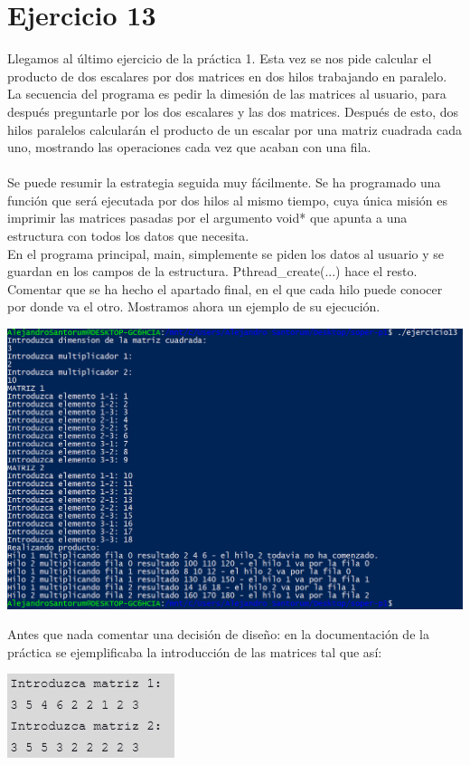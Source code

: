 \documentclass[12pt]{article}
\begin{document}
\section{Ejercicio 13}
Llegamos al último ejercicio de la práctica 1. Esta vez se nos pide calcular el producto de dos escalares por dos matrices en dos hilos trabajando en paralelo.\\ La secuencia del programa es pedir la dimesión de las matrices al usuario, para después preguntarle por los dos escalares y las dos matrices. Después de esto, dos hilos paralelos calcularán el producto de un escalar por una matriz cuadrada cada uno, mostrando las operaciones cada vez que acaban con una fila.\\\\
Se puede resumir la estrategia seguida muy fácilmente. Se ha programado una función que será ejecutada por dos hilos al mismo tiempo, cuya única misión es imprimir las matrices pasadas por el argumento void* que apunta a una estructura con todos los datos que necesita.\\ En el programa principal, main, simplemente se piden los datos al usuario y se guardan en los campos de la estructura. Pthread\_create(...) hace el resto.\\
Comentar que se ha hecho el apartado final, en el que cada hilo puede conocer por donde va el otro. Mostramos ahora un ejemplo de su ejecución.
\begin{center}
	\includegraphics[scale=0.93]{ej13.PNG}
\end{center}
Antes que nada comentar una decisión de diseño: en la documentación de la práctica se ejemplificaba la introducción de las matrices tal que así:
\begin{center}
	\includegraphics[scale=2]{intr_matriz_doc.PNG}
\end{center}
\end{document}
